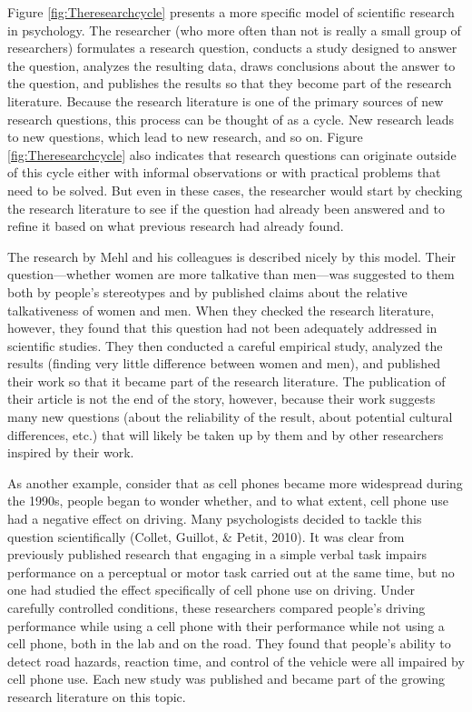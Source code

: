 Figure \ref{fig:Theresearchcycle} presents a more specific model of scientific research in psychology. The researcher (who more often than not is really a small group of researchers) formulates a research question, conducts a study designed to answer the question, analyzes the resulting data, draws conclusions about the answer to the question, and publishes the results so that they become part of the research literature. Because the research literature is one of the primary sources of new research questions, this process can be thought of as a cycle. New research leads to new questions, which lead to new research, and so on. Figure \ref{fig:Theresearchcycle} also indicates that research questions can originate outside of this cycle either with informal observations or with practical problems that need to be solved. But even in these cases, the researcher would start by checking the research literature to see if the question had already been answered and to refine it based on what previous research had already found.

The research by Mehl and his colleagues is described nicely by this model. Their question---whether women are more talkative than men---was suggested to them both by people's stereotypes and by published claims about the relative talkativeness of women and men. When they checked the research literature, however, they found that this question had not been adequately addressed in scientific studies. They then conducted a careful empirical study, analyzed the results (finding very little difference between women and men), and published their work so that it became part of the research literature. The publication of their article is not the end of the story, however, because their work suggests many new questions (about the reliability of the result, about potential cultural differences, etc.) that will likely be taken up by them and by other researchers inspired by their work.

As another example, consider that as cell phones became more widespread during the 1990s, people began to wonder whether, and to what extent, cell phone use had a negative effect on driving. Many psychologists decided to tackle this question scientifically (Collet, Guillot, \& Petit, 2010). It was clear from previously published research that engaging in a simple verbal task impairs performance on a perceptual or motor task carried out at the same time, but no one had studied the effect specifically of cell phone use on driving. Under carefully controlled conditions, these researchers compared people's driving performance while using a cell phone with their performance while not using a cell phone, both in the lab and on the road. They found that people's ability to detect road hazards, reaction time, and control of the vehicle were all impaired by cell phone use. Each new study was published and became part of the growing research literature on this topic.

